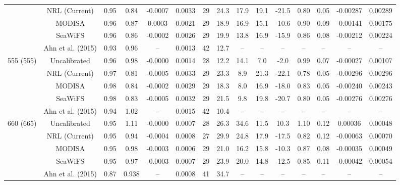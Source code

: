 \documentclass[preview]{standalone}
\begin{document}
\begin{tabular}{ccccccccccccccc}
							& NRL (Current)	& 0.95 & 0.84 & -0.0007 & 0.0033 & 29 & 24.3 & 17.9 & 19.1 & -21.5 & 0.80 & 0.05 & -0.00287 	& 0.00289\\
 							& MODISA 		& 0.96 & 0.87 & 0.0003  & 0.0021 & 29 & 18.9 & 16.9 & 15.1 & -10.6 & 0.90 & 0.09 & -0.00141 	& 0.00175 \\ 
 							& SeaWiFS 		& 0.96 & 0.86 & -0.0002 & 0.0026 & 29 & 19.9 & 13.8 & 16.9 & -15.9 & 0.86 & 0.08  &-0.00212 	& 0.00224\\ 
 							& Ahn et al. (2015) & 0.93 & 0.96 & -- & 0.0013 & 42 & 12.7 & -- & -- & -- & -- & -- & -- & -- \\ \hline
\multirow{5}{*}{555 (555)} 	& Uncalibrated 	& 0.96 & 0.98 & -0.0000 & 0.0014 & 28 & 12.2 & 14.1 & 7.0 & -2.0 & 0.99 & 0.07 & -0.00027 		& 0.00107 \\ 
							& NRL (Current)	& 0.97 & 0.81 & -0.0005 & 0.0033 & 29 & 23.3 & 8.9  & 21.3 & -22.1 & 0.78 & 0.05 & -0.00296 	& 0.00296\\
 							& MODISA 		& 0.98 & 0.84 & -0.0002 & 0.0029 & 29 & 18.3 & 8.0  & 16.9 & -18.0 & 0.83 & 0.05 & -0.00240 	& 0.00243 \\ 
 							& SeaWiFS 		& 0.98 & 0.83 & -0.0005 & 0.0032 & 29 & 21.5 & 9.8  & 19.8 & -20.7 & 0.80 & 0.05 & -0.00276		& 0.00276\\ 
 							& Ahn et al. (2015) & 0.94 & 1.02 & -- & 0.0015 & 42 & 10.4 & -- & -- & -- & -- & -- & -- & -- \\ \hline
\multirow{5}{*}{660 (665)} 	& Uncalibrated 	& 0.95 & 1.11 & -0.0000 & 0.0007 & 28 & 26.3 & 34.6 & 11.5 &  10.3 & 1.10 & 0.12 &  0.00036 	& 0.00048 \\ 
							& NRL (Current)	& 0.95 & 0.94 & -0.0004 & 0.0008 & 27 & 29.9 & 24.8 & 17.9 & -17.5 & 0.82 &  0.12 & -0.00063 	& 0.00070\\
 							& MODISA 		& 0.95 & 0.98 & -0.0003 & 0.0006 & 29 & 21.0 & 16.2 & 15.8 & -10.3 & 0.87 & 0.08& -0.00035 		& 0.00049 \\ 
 							& SeaWiFS 		& 0.95 & 0.97 & -0.0003 & 0.0007 & 29 & 23.9 & 20.0 & 14.8 & -12.5 & 0.85 & 0.11 & -0.00042		& 0.00054\\ 
							& Ahn et al. (2015) & 0.87 & 0.938 & -- & 0.0008 & 41 & 34.7 & -- & -- & -- & -- & -- & -- & -- \\ \hline
\end{tabular}
\end{document}
